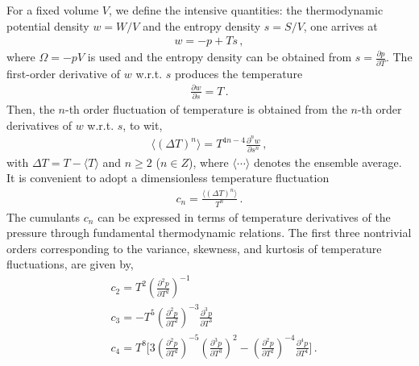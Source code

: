 \documentclass[aps,twocolumn,prd,superscriptaddress,nofootinbib,floatfix]{revtex4-2}
\begin{document}
For a fixed volume $V$, we define the intensive quantities:  the thermodynamic potential density $w=W/V$ and the entropy density $s=S/V$, one arrives at
\begin{align}
    w=-p+T s\,, \label{}
\end{align}
where $\Omega=-pV$ is used and the entropy density can be obtained from  $s=\frac{\partial p}{\partial T}$. The first-order derivative of $w$ w.r.t. $s$ produces the temperature
\begin{align}
    \frac{\partial w}{\partial s}=T\,. \label{}
\end{align}
Then, the $n$-th order fluctuation of temperature is obtained from the $n$-th order derivatives of $w$ w.r.t. $s$, to wit,
\begin{align}
    \langle(\Delta T)^n \rangle=T^{4n-4}\frac{\partial^n w}{\partial s^n}\,, \label{eq:DeltaTn}
\end{align}
with $\Delta T=T-\langle T \rangle$ and $n\geq 2$ ($n \in Z$), where $\langle \cdots \rangle$ denotes the ensemble average. It is convenient to adopt a dimensionless temperature fluctuation
\begin{align}
    c_n=\frac{\langle(\Delta T)^n \rangle}{T^n}\,. \label{eq:cn}
\end{align}
The cumulants $c_n$ can be expressed in terms of temperature derivatives of the pressure through fundamental thermodynamic relations. The first three nontrivial orders corresponding to the variance, skewness, and kurtosis of temperature fluctuations, are given by,
\begin{equation}\label{eq:c234}\begin{split}
    & c_2=T^2\left(\frac{\partial^2 p}{\partial T^2}\right)^{-1}\,\\[2ex]
    & c_3=-T^5\left(\frac{\partial^2 p}{\partial T^2}\right)^{-3}\frac{\partial^3 p}{\partial T^3}\,\\[2ex]
    & c_4=T^8\Bigg[3\left(\frac{\partial^2 p}{\partial T^2}\right)^{-5}\left(\frac{\partial^3 p}{\partial T^3}\right)^2-\left(\frac{\partial^2 p}{\partial T^2}\right)^{-4}\frac{\partial^4 p}{\partial T^4}\Bigg]\,.
\end{split} 
\end{equation}
\end{document}
